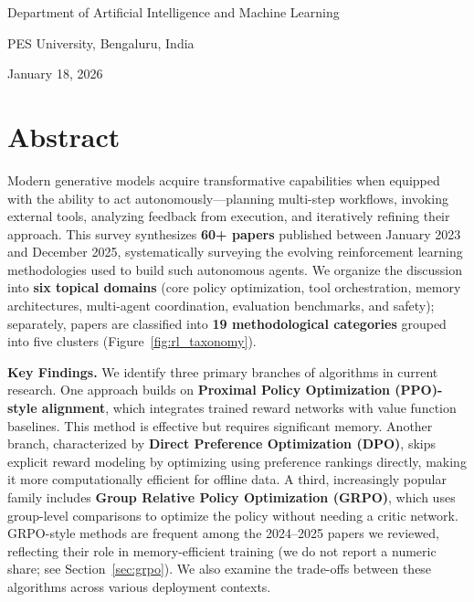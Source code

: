 \documentclass[12pt,a4paper]{report}
\theoremstyle{definition}
\newcommand{\reportdate}{January 18, 2026}
\begin{document}
\begin{titlepage}
	    \vspace{0.4cm}
	    {\large Department of Artificial Intelligence and Machine Learning\par}
	    {\large PES University, Bengaluru, India\par}
	    \vspace{0.4cm}
	    {\large \reportdate\par}
\end{titlepage}
\hypersetup{pageanchor=true}

\chapter*{Abstract}

Modern generative models acquire transformative capabilities when equipped with the ability to act autonomously---planning multi-step workflows, invoking external tools, analyzing feedback from execution, and iteratively refining their approach.
 This survey synthesizes \textbf{60+ papers} published between January 2023 and December 2025, systematically surveying the evolving reinforcement learning methodologies used to build such autonomous agents. We organize the discussion into \textbf{six topical domains} (core policy optimization, tool orchestration, memory architectures, multi-agent coordination, evaluation benchmarks, and safety); separately, papers are classified into \textbf{19 methodological categories} grouped into five clusters (Figure~\ref{fig:rl_taxonomy}).

\textbf{Key Findings.} We identify three primary branches of algorithms in current research. One approach builds on \textbf{Proximal Policy Optimization (PPO)-style alignment}, which integrates trained reward networks with value function baselines.
 This method is effective but requires significant memory. Another branch, characterized by \textbf{Direct Preference Optimization (DPO)}, skips explicit reward modeling
 by optimizing using preference rankings directly, making it more computationally efficient for offline data.
 A third, increasingly popular family includes \textbf{Group Relative Policy Optimization (GRPO)}, which uses group-level comparisons to optimize the policy without needing a critic network. GRPO-style methods are frequent among the 2024--2025 papers we reviewed, reflecting their role in memory-efficient training (we do not report a numeric share; see Section~\ref{sec:grpo}). We also examine the trade-offs between these algorithms across various deployment contexts.
\end{document}
